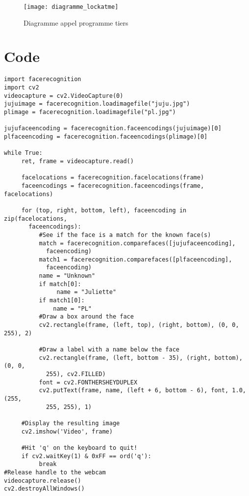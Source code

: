 \begin{figure}[h]
  \texttt{[image: diagramme\_lockatme]}
  \caption{Diagramme appel programme tiers}
  \label{fig:dialam}
\end{figure}


\chapter{Code}
\newpage
\begin{verbatim}
import facerecognition
import cv2
videocapture = cv2.VideoCapture(0)
jujuimage = facerecognition.loadimagefile("juju.jpg")
plimage = facerecognition.loadimagefile("pl.jpg")

jujufaceencoding = facerecognition.faceencodings(jujuimage)[0]
plfaceencoding = facerecognition.faceencodings(plimage)[0]

while True:
     ret, frame = videocapture.read()

     facelocations = facerecognition.facelocations(frame)
     faceencodings = facerecognition.faceencodings(frame, facelocations)

     for (top, right, bottom, left), faceencoding in zip(facelocations,
       faceencodings):
          #See if the face is a match for the known face(s)
          match = facerecognition.comparefaces([jujufaceencoding],
            faceencoding)
          match1 = facerecognition.comparefaces([plfaceencoding],
            faceencoding)
          name = "Unknown"
          if match[0]:
               name = "Juliette"
          if match1[0]:
              name = "PL"
          #Draw a box around the face
          cv2.rectangle(frame, (left, top), (right, bottom), (0, 0, 255), 2)

          #Draw a label with a name below the face
          cv2.rectangle(frame, (left, bottom - 35), (right, bottom), (0, 0,
            255), cv2.FILLED)
          font = cv2.FONTHERSHEYDUPLEX
          cv2.putText(frame, name, (left + 6, bottom - 6), font, 1.0, (255,
            255, 255), 1)

     #Display the resulting image
     cv2.imshow('Video', frame)

     #Hit 'q' on the keyboard to quit!
     if cv2.waitKey(1) & 0xFF == ord('q'):
          break
#Release handle to the webcam
videocapture.release()
cv2.destroyAllWindows()
\end{verbatim}
